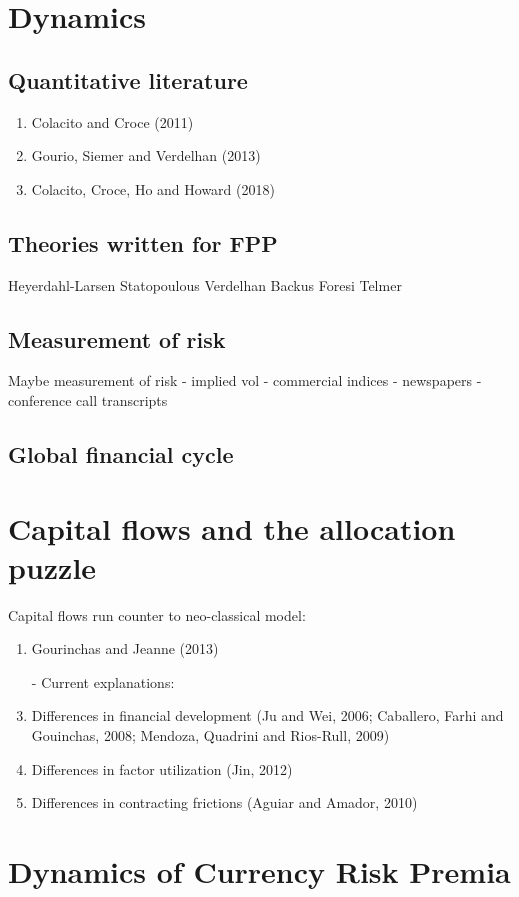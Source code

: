 \documentclass[12pt,letter]{article}
\theoremstyle{break} \theorembodyfont{\normalfont\itshape}
\theoremstyle{break}
\theoremstyle{break} \theorembodyfont{\normalfont\itshape}
\theoremstyle{break} \theorembodyfont{\normalfont\itshape}
\begin{document}
\section{Dynamics}
\subsection{Quantitative literature}
\begin{enumerate}
\item Colacito and Croce (2011)
\item Gourio, Siemer and Verdelhan (2013)
\item Colacito, Croce, Ho and Howard (2018)
\end{enumerate}
\subsection{Theories written for FPP}
Heyerdahl-Larsen
Statopoulous
Verdelhan
Backus Foresi Telmer
\subsection{Measurement of risk}
Maybe measurement of risk
- implied vol
- commercial indices
- newspapers
- conference call transcripts
\subsection{Global financial cycle}

\section{Capital flows and the allocation puzzle}
Capital flows run counter to neo-classical model:
\begin{enumerate}
\item Gourinchas and Jeanne (2013)
\item[-] Current explanations:
\item Differences in financial development (Ju and Wei, 2006;
  Caballero, Farhi and Gouinchas, 2008; Mendoza, Quadrini and
  Rios-Rull, 2009)
\item Differences in factor utilization (Jin, 2012)
\item Differences in contracting frictions (Aguiar and Amador, 2010)
\end{enumerate}

\section{Dynamics of Currency Risk Premia}
\end{document}
